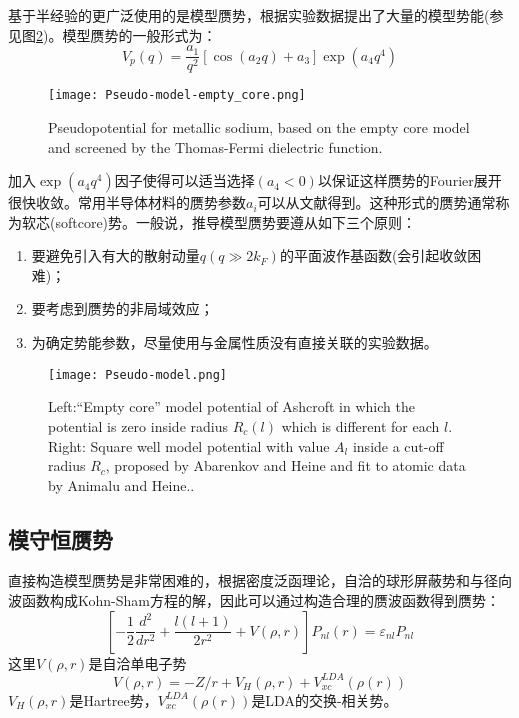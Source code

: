 基于半经验的更广泛使用的是模型赝势，根据实验数据提出了大量的模型势能\cite{PM9-451_1964,PM12-529_1965,JPF2-270_1972,PRB11-2717_1975,PRB11-2726_1975,JPF6-L271_1976,PR174-769_1968}(参见图\ref{Pseudo-model})。模型赝势的一般形式为：
\begin{equation}
  V_p(q)=\frac{a_1}{q^2}[\cos(a_2q)+a_3]\exp(a_4q^4)
  \label{eq:solid-102}
\end{equation}
\begin{figure}[h!]
\centering
\texttt{[image: Pseudo-model-empty\_core.png]}
\caption{\small \textrm{Pseudopotential for metallic sodium, based on the empty core model and screened by the Thomas-Fermi dielectric function.}}%
\label{Pseudo_model-empty_core}
\end{figure}
加入$\exp(a_4q^4)$因子使得可以适当选择$(a_4<0)$以保证这样赝势的Fourier展开很快收敛。常用半导体材料的赝势参数$a_i$可以从文献\cite{PRB15-2154_1977}得到。这种形式的赝势通常称为软芯(softcore)势。一般说，推导模型赝势要遵从如下三个原则：
\begin{enumerate}
  \item 
要避免引入有大的散射动量$q(q\gg 2k_F)$的平面波作基函数(会引起收敛困难)；%
  \item 
要考虑到赝势的非局域效应；
  \item 
为确定势能参数，尽量使用与金属性质没有直接关联的实验数据。
\end{enumerate}
\begin{figure}[h!]
\centering
\texttt{[image: Pseudo-model.png]}
\caption{\small \textrm{Left:``Empty core'' model potential of Ashcroft in which the potential is zero inside radius $R_c(l)$ which is different for each $l$. Right: Square well model potential with value $A_l$ inside a cut-off radius $R_c$, proposed by Abarenkov and Heine and fit to atomic data by Animalu and Heine..}}%
\label{Pseudo-model}
\end{figure}

\subsection{模守恒赝势}
直接构造模型赝势是非常困难的，根据密度泛函理论，自洽的球形屏蔽势和与径向波函数构成Kohn-Sham方程的解，因此可以通过构造合理的赝波函数得到赝势：
\begin{equation}
  \left[-\frac12\frac{d^2}{dr^2}+\frac{l(l+1)}{2r^2}+V(\rho,r)\right]P_{nl}(r)=\varepsilon_{nl}P_{nl}
  \label{eq:solid-103}
\end{equation}
这里$V(\rho,r)$是自洽单电子势$$V(\rho,r)=-Z/r+V_H(\rho,r)+V_{xc}^{LDA}(\rho(r))$$
$V_H(\rho,r)$是Hartree势，$V_{xc}^{LDA}(\rho(r))$是LDA的交换-相关势。

